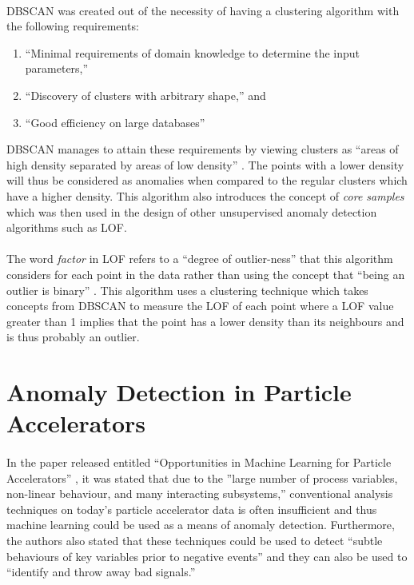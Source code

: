 \paragraph{ }\acs{DBSCAN} was created out of the necessity of having a clustering algorithm with the following requirements:
\begin{enumerate}
	\item ``Minimal requirements of domain knowledge to determine the input parameters,''
	\item ``Discovery of clusters with arbitrary shape,'' and
	\item ``Good efficiency on large databases'' \cite{Ester1996}
\end{enumerate}
\acs{DBSCAN} manages to attain these requirements by viewing clusters as ``areas of high density separated by areas of low density'' \cite{Sklearn2}. The points with a lower density will thus be considered as anomalies when compared to the regular clusters which have a higher density. This algorithm also introduces the concept of \textit{core samples} which was then used in the design of other unsupervised anomaly detection algorithms such as \acs{LOF}. 

\paragraph{ }The word \textit{factor} in \acs{LOF} refers to a ``degree of outlier-ness'' that this algorithm considers for each point in the data rather than using the concept that ``being an outlier is binary'' \cite{Breunig2000}. This algorithm uses a clustering technique which takes concepts from \acs{DBSCAN} to measure the \acs{LOF} of each point where a \acs{LOF} value greater than 1 implies that the point has a lower density than its neighbours and is thus probably an outlier.

\section{Anomaly Detection in Particle Accelerators}

\paragraph{ }In the paper released entitled ``Opportunities in Machine Learning for Particle Accelerators'' \cite{Edelen2018}, it was stated that due to the ''large number of process variables, non-linear behaviour, and many interacting subsystems,'' conventional analysis techniques on today's particle accelerator data is often insufficient and thus machine learning could be used as a means of anomaly detection. Furthermore, the authors also stated that these techniques could be used to detect ``subtle behaviours of key variables prior to negative events'' and they can also be used to ``identify and throw away bad signals.''

